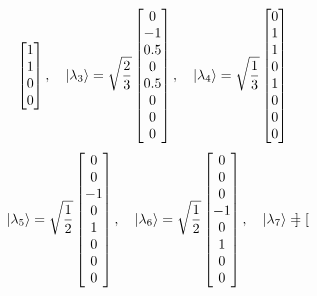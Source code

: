 \begin{example}
\begin{equation}
\begin{bmatrix}
			1 \\
			1 \\
			0 \\
			0 \\
		\end{bmatrix}, \quad \ket{\lambda_3}=\sqrt{\frac{2}{3}}
		\begin{bmatrix}
			0 \\
			-1 \\
			0.5 \\
			0 \\
			0.5 \\
			0 \\
			0 \\
			0 \\
		\end{bmatrix}, \quad \ket{\lambda_4}=\sqrt{\frac{1}{3}}
		\begin{bmatrix}
			0 \\
			1 \\
			1 \\
			0 \\
			1 \\
			0 \\
			0 \\
			0 \\
		\end{bmatrix}	
	\end{equation}
	\begin{equation}
		\ket{\lambda_5}=\sqrt{\frac{1}{2}}
		\begin{bmatrix}
			0 \\
			0 \\
			-1 \\
			0 \\
			1 \\
			0 \\
			0 \\
			0 \\
		\end{bmatrix}, \quad \ket{\lambda_6}=\sqrt{\frac{1}{2}}
		\begin{bmatrix}
			0 \\
			0 \\
			0 \\
			-1 \\
			0 \\
			1 \\
			0 \\
			0 \\
		\end{bmatrix}, \quad \ket{\lambda_7}=
		\begin{bmatrix}

\end{bmatrix}
\end{equation}
\end{example}
